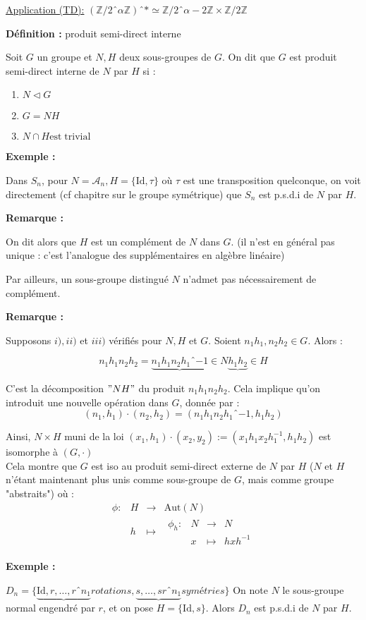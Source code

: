 \documentclass{report}
\newenvironment{definition}[1][]{
    \begin{tcolorbox}[colframe= white]
    \textbf{Définition :} 
    #1 \par
    }
    {\end{tcolorbox}}
\newenvironment{exemple}{\begin{tcolorbox}[colback=gray!10,colframe= white]
    \textbf{Exemple :}
     \par}
    {\end{tcolorbox}}
\newcommand{\remarque}{
    \noindent\textbf{Remarque :} \par
}
\newcommand{\fonction}[5]{
    \begin{array}{l|rcl}
    #1: & #2 & \longrightarrow & #3 \\
        & #4 & \longmapsto & #5 
    \end{array}
}
\begin{document}
\underline{Application (TD):} $(\mathbb{Z}/{2ˆ{\alpha}\mathbb{Z}})ˆ* \simeq \mathbb{Z}/{2ˆ{\alpha - 2}\mathbb{Z}} \times \mathbb{Z} / {2 \mathbb{Z}}$

\begin{definition}[produit semi-direct interne]
Soit $G$ un groupe et $N, H$ deux sous-groupes de $G$.
On dit que $G$ est produit semi-direct interne de $N$ par $H$ si :
\begin{enumerate}
\item $ N \triangleleft G $
\item $ G = N H $
\item $ N \cap H \mathrm{est \; trivial} $
\end{enumerate}

\end{definition}

\begin{exemple}
Dans $S_n$, pour $N = \mathcal{A}_n, H = \{ \mathrm{Id}, \tau \}$ où $\tau$ est une transposition quelconque, on voit directement (cf chapitre sur le groupe symétrique) que $S_n$ est p.s.d.i de $N$ par $H$.
\end{exemple}

\remarque{ On dit alors que $H$ est un complément de $N$ dans $G$. (il n'est en général pas unique : c'est l'analogue des supplémentaires en algèbre linéaire) \par
Par ailleurs, un sous-groupe distingué $N$ n'admet pas nécessairement de complément.}

\remarque{ Supposons $i), ii)$ et $iii)$ vérifiés pour $N, H$ et $G$.
Soient $n_1 h_1, n_2 h_2 \in G$. Alors : 

$$n_1h_1n_2h_2 = \underbrace{n_1 h_1 n_2 h_1ˆ{-1}}{\in N} \underbrace{h_1 h_2}{\in H}$$

C'est la décomposition $"NH"$ du produit $n_1h_1n_2h_2$. Cela implique qu'on introduit une nouvelle opération dans $G$, donnée par : 
$$(n_1,h_1) \cdot (n_2,h_2) = (n_1 h_1 n_2 h_1ˆ{-1}, h_1h_2) $$

Ainsi, $N \times H$ muni de la loi $(x_1, h_1) \cdot (x_2, y_2) := (x_1 h_1 x_2 h_1 ^{-1},h_1 h_2)$ est isomorphe à $(G,\cdot)$\\

Cela montre que $G$ est iso au produit semi-direct externe de $N$ par $H$ ($N$ et $H$ n'étant maintenant plus unis comme sous-groupe de $G$, mais comme groupe "abstraits") où :
$$\fonction{\phi}{H}{\mathrm{Aut}(N)}{h}{\fonction{\phi_{h}}{N}{N}{x}{hxh^{-1}}}$$}

\begin{exemple}[Groupe diédral]
$D_n = \{ \underbrace{\mathrm{Id}, r, \dots, rˆ{n_1}}{rotations}, \underbrace{s, \dots, srˆ{n_1}}{symétries} \}$
On note $N$ le sous-groupe normal engendré par $r$, et on pose $H = \{ \mathrm{Id}, s \}.$
Alors $D_n$ est p.s.d.i de $N$ par $H$.
\end{exemple}
\end{document}
